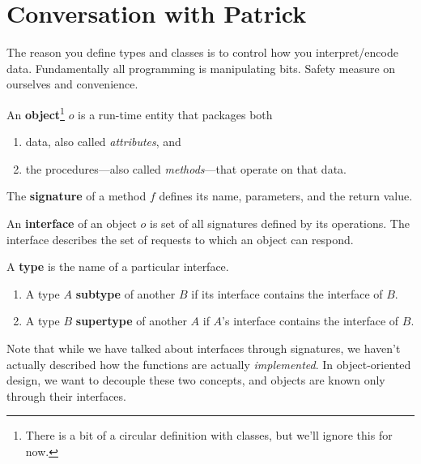 \section{Conversation with Patrick}


  The reason you define types and classes is to control how you interpret/encode data. Fundamentally all programming is manipulating bits. Safety measure on ourselves and convenience. 

  \begin{definition}[Object]
    An \textbf{object}\footnote{There is a bit of a circular definition with classes, but we'll ignore this for now.} $o$ is a run-time entity that packages both 
    \begin{enumerate}
      \item data, also called \textit{attributes}, and 
      \item the procedures---also called \textit{methods}---that operate on that data.
    \end{enumerate}
  \end{definition} 

  \begin{definition}[Signature]
    The \textbf{signature} of a method $f$ defines its name, parameters, and the return value.  
  \end{definition}

  \begin{definition}[Interface]
    An \textbf{interface} of an object $o$ is set of all signatures defined by its operations. The interface describes the set of requests to which an object can respond. 
  \end{definition} 

  \begin{definition}[Type]
    A \textbf{type} is the name of a particular interface. 
    \begin{enumerate}
      \item A type $A$ \textbf{subtype} of another $B$ if its interface contains the interface of $B$. 
      \item A type $B$ \textbf{supertype} of another $A$ if $A$'s interface contains the interface of $B$. 
    \end{enumerate}
  \end{definition} 

  Note that while we have talked about interfaces through signatures, we haven't actually described how the functions are actually \textit{implemented}. In object-oriented design, we want to decouple these two concepts, and objects are known only through their interfaces. 

